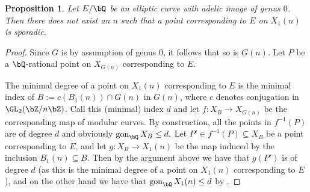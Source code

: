 \documentclass[11pt,reqno]{amsart}
\theoremstyle{plain}
\newtheorem{proposition}[theorem]{Proposition}
\theoremstyle{definition}
\DeclareMathOperator{\gon}{gon}
\newcommand{\Q}{\bQ}
\newcommand{\Z}{\bZ}
\begin{document}
\begin{proposition}
Let $E/\Q$ be an elliptic curve with adelic image of genus $0$. Then there does not exist an $n$ such that a point corresponding to $E$ on $X_1(n)$ is sporadic.
\end{proposition}
\begin{proof}
Since $G$ is by assumption of genus $0$, it follows that so is $G(n)$. Let $P$ be a $\Q$-rational point on $X_{G(n)}$ corresponding to $E$.


The minimal degree of a point on $X_1(n)$ corresponding to $E$ is the minimal index of $B:=c(B_1(n))\cap G(n)$ in $G(n)$, where $c$ denotes conjugation in $\GL_2(\Z /n \Z)$.
Call this (minimal) index $d$ and let $f:X_{B}\rightarrow X_{G(n)}$ be the corresponding map of modular curves. By construction, all the points in $f^{-1}(P)$ are of degree $d$ and obviously $\gon_\Q X_{B}\leq d.$ Let $P'\in f^{-1}(P) \subseteq X_{B}$ be a point corresponding to $E$, and let $g:X_{B}\rightarrow X_1(n)$ be the map induced by the inclusion $B_1(n) \subseteq B$. Then by the argument above we have that $g(P')$ is of degree $d$ (as this is the minimal degree of a point on $X_1(n)$ corresponding to $E$), and on the other hand we have that $\gon_\Q X_1(n)\leq d$ by \cite[Proposition A.1 (vii)]{Poonen:gonality}.
\end{proof}




\vspace{20 mm}


\end{document}
